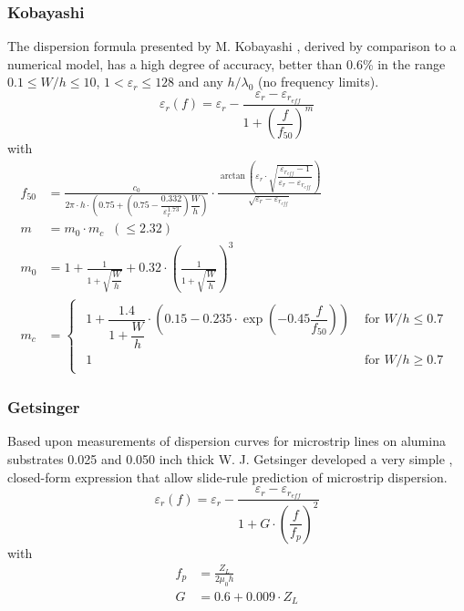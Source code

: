 \documentclass[10pt]{report}
\begin{document}
\subsubsection{Kobayashi}

The dispersion formula presented by M. Kobayashi \cite{Kobayashi},
derived by comparison to a numerical model, has a high degree of
accuracy, better than 0.6\% in the range $0.1 \le W/h \le 10$, $1 <
\varepsilon_r \le 128$ and any $h/\lambda_0$ (no frequency limits).
\begin{equation}
\varepsilon_{r}(f) = \varepsilon_{r} - \frac{\varepsilon_{r} - \varepsilon_{r_{eff}}}{1 + \left(\dfrac{f}{f_{50}}\right)^{m}}
\end{equation}
with
\begin{align}
f_{50} &= \frac{c_{0}}{2\pi\cdot h \cdot\left(0.75 + \left(0.75 - \dfrac{0.332}{\varepsilon_{r}^{1.73}}\right)\dfrac{W}{h}\right)} \cdot \frac{\arctan\left(\varepsilon_{r}\cdot\sqrt{\dfrac{\varepsilon_{r_{eff}} - 1}{\varepsilon_{r} - \varepsilon_{r_{eff}}}}\right)}{\sqrt{\varepsilon_{r} - \varepsilon_{r_{eff}}}}\\
m &= m_{0}\cdot m_{c} \;\; (\le 2.32)\\
m_{0} &= 1 + \frac{1}{1 + \sqrt{\dfrac{W}{h}}} + 0.32\cdot\left(\frac{1}{1 + \sqrt{\dfrac{W}{h}}}\right)^{3}\\
m_{c} &=
\begin{cases}
\begin{array}{ll}
1 + \dfrac{1.4}{1 + \dfrac{W}{h}}\cdot\left(0.15 - 0.235\cdot\exp\left(-0.45\dfrac{f}{f_{50}}\right)\right) & \textrm{ for } W / h \le 0.7\\
1 & \textrm{ for } W / h \ge 0.7
\end{array}
\end{cases}
\end{align}

\subsubsection{Getsinger}

Based upon measurements of dispersion curves for microstrip lines on
alumina substrates 0.025 and 0.050 inch thick W. J. Getsinger
\cite{Getsinger} developed a very simple , closed-form expression that
allow slide-rule prediction of microstrip dispersion.
\begin{equation}
\varepsilon_{r}(f) = \varepsilon_{r} - \frac{\varepsilon_{r} - \varepsilon_{r_{eff}}}{1 + G\cdot \left(\dfrac{f}{f_{p}}\right)^{2}}
\end{equation}
with
\begin{align}
f_{p} &= \frac{Z_{L}}{2\mu_{0} h}\\
G &= 0.6 + 0.009\cdot Z_{L}
\end{align}
\end{document}
